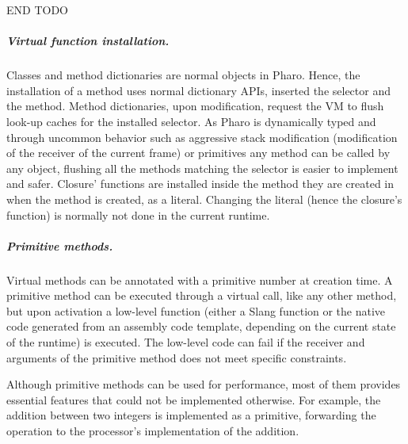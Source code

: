 \documentclass[a4paper,12pt,twoside]{../includes/ThesisStyle}
\begin{document}







END TODO

\subparagraph{Virtual function installation.}

Classes and method dictionaries are normal objects in Pharo. Hence, the installation of a method uses normal dictionary APIs, inserted the selector and the method. Method dictionaries, upon modification, request the VM to flush look-up caches for the installed selector. As Pharo is dynamically typed and through uncommon behavior such as aggressive stack modification (modification of the receiver of the current frame) or primitives any method can be called by any object, flushing all the methods matching the selector is easier to implement and safer. Closure' functions are installed inside the method they are created in when the method is created, as a literal. Changing the literal (hence the closure's function) is normally not done in the current runtime.

\subparagraph{Primitive methods.}

Virtual methods can be annotated with a primitive number at creation time. A primitive method can be executed through a virtual call, like any other method, but upon activation a low-level function (either a Slang function or the native code generated from an assembly code template, depending on the current state of the runtime) is executed. The low-level code can fail if the receiver and arguments of the primitive method does not meet specific constraints. 

Although primitive methods can be used for performance, most of them provides essential features that could not be implemented otherwise. For example, the addition between two integers is implemented as a primitive, forwarding the operation to the processor's implementation of the addition.
\end{document}
